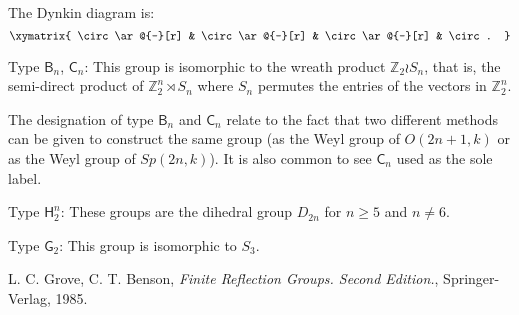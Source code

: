 \documentclass[12pt]{article}
\begin{document}
The Dynkin diagram is:
\[\xymatrix{
\circ\ar@{-}[r] & \circ\ar@{-}[r] & \circ\ar@{--}[r] & \circ .
}\]

Type $\mathsf{B}_n$, $\mathsf{C}_n$: This group is isomorphic to the wreath product $\mathbb{Z}_2\wr S_n$, that is, the semi-direct product of 
$\mathbb{Z}_2^n \rtimes S_n$ where $S_n$ permutes the entries of the vectors in
$\mathbb{Z}_2^n$.

The designation of type $\mathsf{B}_n$ and $\mathsf{C}_n$ relate to the fact that two different methods can be given to construct the same group (as the Weyl group of $O(2n+1,k)$ or as the Weyl group of $Sp(2n,k)$).
It is also common to see $\mathsf{C}_n$ used as the sole label.

Type $\mathsf{H}_2^n$: These groups are the dihedral group $D_{2n}$ for 
$n\geq 5$ and $n\neq 6$.

Type $\mathsf{G}_2$:  This group is isomorphic to $S_3$.

\begin{thebibliography}
{}L. C. Grove, C. T. Benson, \emph{Finite Reflection Groups. Second Edition.}, Springer-Verlag, 1985.
\end{thebibliography}
\end{document}
